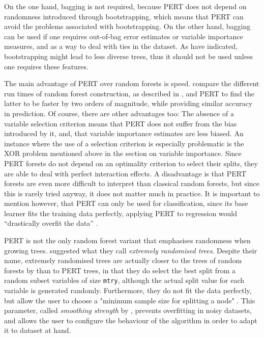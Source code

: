 \documentclass[a4paper,man,12pt,apacite,floatsintext]{apa6} %
\begin{document}
On the one hand, bagging is not required, because PERT does not depend on
randomness introduced through bootstrapping, which means that PERT can
avoid the problems associated with bootstrapping.
On the other hand, bagging can be used if one requires out-of-bag
error estimates or variable importance measures, and as a way to deal
with ties in the dataset.
As  have indicated, bootstrapping might lead
to less diverse trees, thus it should not be used unless one requires
these features.

The main advantage of PERT over random forests is speed.
 compare the different run times of random
forest construction, as described in , and PERT
to find the latter to be faster by two orders of magnitude,
while providing similar accuracy in prediction.
Of course, there are other advantages too:
The absence of a variable selection criterion means that PERT does not suffer
from the bias introduced by it, and, that variable importance estimates are less
biased.
An instance where the use of a selection criterion is especially problematic
is the XOR problem mentioned above in the section on variable importance.
Since PERT forests do not depend on an optimality criterion to select their
splits, they are able to deal with perfect
interaction effects.
A disadvantage is that PERT forests are even more difficult to interpret than
classical random forests, but since this is rarely tried anyway,
it does not matter much in practice.
It is important to mention however, that PERT can only be used for
classification,
since its base learner fits the training data perfectly, applying PERT to
regression would “drastically overfit the data” \cite{cutler2001pert}.

PERT is not the only random forest variant that emphasises randomness
when growing trees.
 suggested what they call \emph{extremely randomised trees}.
Despite their name, extremely randomised trees are actually closer to the
trees of random forests by  than to PERT trees, 
in that they do select the best split from a random subset variables of size \texttt{mtry},
although the actual split value for each variable is generated randomly.
Furthermore, they do not fit the data perfectly, but allow the user to
choose a "minimum sample size for splitting a node" \cite{geurts2006extremely}.
This parameter, called \emph{smoothing strength} by ,
prevents overfitting in noisy datasets, and allows the user to configure the
behaviour of the algorithm in order to adapt
it to dataset at hand.
\end{document}

